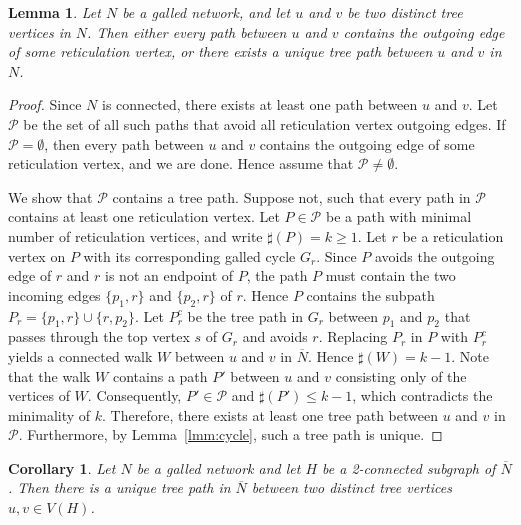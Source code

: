 \documentclass[pdflatex,sn-mathphys-num]{sn-jnl}
\newcommand{\nret}[1]{\sharp({#1})}
\theoremstyle{thmstyleone}%
\theoremstyle{thmstyletwo}%
\newtheorem{lemma}{Lemma}
\newtheorem{corollary}{Corollary}
\theoremstyle{thmstylethree}%
\begin{document}
\begin{lemma} \label{lmm:treepathuni}
Let $N$ be a galled network, and let $u$ and $v$ be two distinct tree vertices in $N$. Then either every path between $u$ and $v$ contains the outgoing edge of some reticulation vertex, or there exists a unique tree path between $u$ and $v$ in $N$.
\end{lemma}

\begin{proof}
Since $N$ is connected, there exists at least one path between $u$ and $v$. Let $\mathcal{P}$ be the set of all such paths that avoid all reticulation vertex outgoing edges. If $\mathcal{P}=\emptyset$, then every path between $u$ and $v$ contains the outgoing edge of some reticulation vertex, and we are done. Hence assume that $\mathcal{P}\neq\emptyset$.

We show that $\mathcal{P}$ contains a tree path. Suppose not, such that every path in $\mathcal{P}$ contains at least one reticulation vertex. Let $P\in\mathcal{P}$ be a path with minimal number of reticulation vertices, and write $\nret{P}=k\geq 1$. 
Let $r$ be a reticulation vertex on $P$ with its corresponding galled cycle $G_r$. Since $P$ avoids the outgoing edge of $r$ and $r$ is not an endpoint of $P$, the path $P$ must contain the two incoming edges $\{p_1,r\}$ and $\{p_2,r\}$ of $r$. Hence $P$ contains the subpath $P_r=\{p_1,r\}\cup\{r,p_2\}$. Let $P_r^c$ be the tree path in $G_r$ between $p_1$ and $p_2$ that passes through the top vertex $s$ of $G_r$ and avoids $r$. Replacing $P_r$ in $P$ with $P_r^c$ yields a connected walk $W$ between $u$ and $v$ in $\overline{N}$. Hence $\nret{W}=k-1$. Note that the walk $W$ contains a path $P'$ between $u$ and $v$ consisting only of the vertices of $W$. Consequently, $P' \in \mathcal{P}$ and $\nret{P'} \leq k-1$, which contradicts the minimality of $k$. Therefore, there exists at least one tree path between $u$ and $v$ in $\mathcal{P}$. Furthermore,
by Lemma~\ref{lmm:cycle}, such a tree path is unique.
\end{proof}


\begin{corollary}\label{cor:treepath-2-connected}
Let $N$ be a galled network and let $H$ be a 2-connected subgraph of $\overline{N}$. Then there is a unique tree path in $\overline{N}$ between two distinct tree vertices $u,v\in V(H)$.
\end{corollary}
\end{document}
